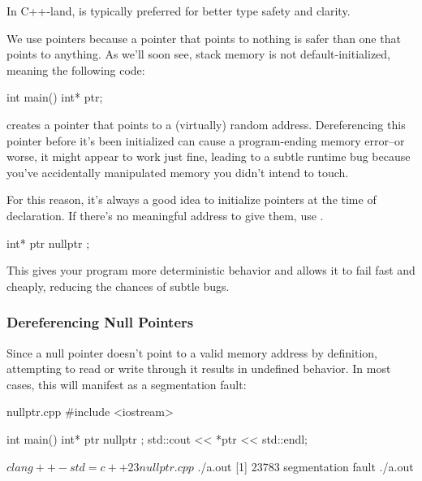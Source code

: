 \documentclass[12pt]{article}
\begin{document}
\noindent
In C++-land,  is typically preferred for better type safety and clarity.

\vspace{1em}
\noindent
We use  pointers because a pointer that points to nothing is safer than one that points to anything.
As we'll soon see, stack memory is not default-initialized, meaning the following code:

\begin{cxx}{}
int main() {
	int* ptr;
}
\end{cxx}

\noindent
creates a pointer that points to a (virtually) random address.
Dereferencing this pointer before it's been initialized can cause a program-ending memory error--or worse, it might appear to work just fine, leading to a subtle runtime bug because you've accidentally manipulated memory you didn't intend to touch.

\begin{advice}
\noindent
For this reason, it's always a good idea to initialize pointers at the time of declaration.
If there's no meaningful address to give them, use .

\begin{cxx}{}
int* ptr { nullptr };
\end{cxx}

\noindent
This gives your program more deterministic behavior and allows it to fail fast and cheaply, reducing the chances of subtle bugs.
\end{advice}

\subsubsection{Dereferencing Null Pointers}

\noindent
Since a null pointer doesn't point to a valid memory address by definition, attempting to read or write through it results in undefined behavior.
In most cases, this will manifest as a segmentation fault:

\begin{cxx}{nullptr.cpp}
#include <iostream>

int main()
{
    int* ptr { nullptr };
    std::cout << *ptr << std::endl;
}
\end{cxx}

\begin{terminal}
$ clang++ -std=c++23 nullptr.cpp
$ ./a.out
[1]    23783 segmentation fault  ./a.out
\end{terminal}
\end{document}
